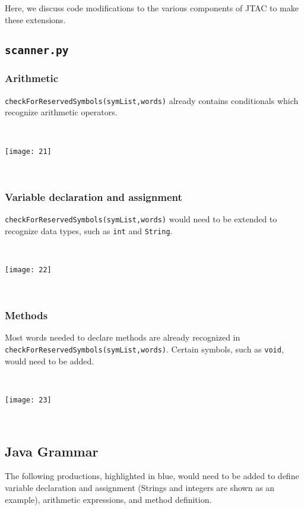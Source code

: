 \documentclass[11pt]{article}
\begin{document}
Here, we discuss code modifications to the various components of JTAC to make these extensions.

\subsection{{\tt scanner.py}}

\subsubsection{Arithmetic}

{\tt checkForReservedSymbols(symList,words)} already contains conditionals which recognize arithmetic operators.

~
\begin{center}
\texttt{[image: 21]}
\end{center}
~

\subsubsection{Variable declaration and assignment}

{\tt checkForReservedSymbols(symList,words)} would need to be extended to recognize data types, such as {\tt int} and {\tt String}.

~
\begin{center}
\texttt{[image: 22]}
\end{center}
~

\subsubsection{Methods}

Most words needed to declare methods are already recognized in {\tt checkForReservedSymbols(symList,words)}. Certain symbols, such as {\tt void}, would need to be added.

~
\begin{center}
\texttt{[image: 23]}
\end{center}
~

\subsection{Java Grammar}

The following productions, highlighted in blue, would need to be added to define variable declaration and assignment (Strings and integers are shown as an example), arithmetic expressions, and method definition.
\end{document}
